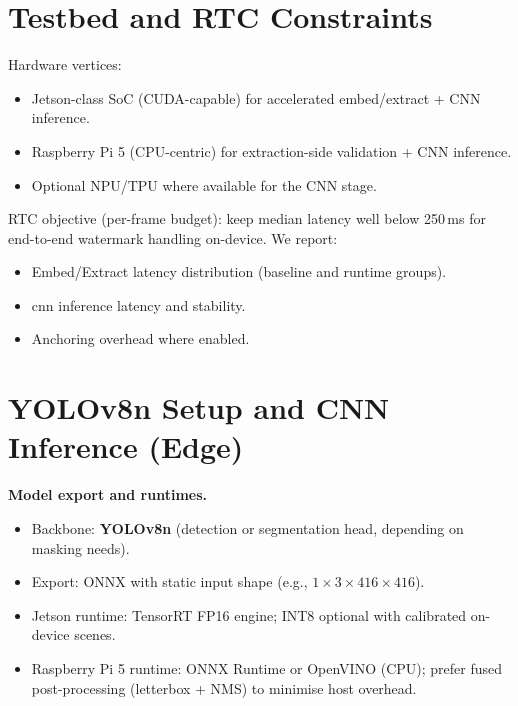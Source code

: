 
\section{Testbed and RTC Constraints}
\label{sec:validation:testbed}

Hardware vertices:
\begin{itemize}
    \item Jetson-class SoC (CUDA-capable) for accelerated embed/extract + CNN inference.
    \item Raspberry Pi 5 (CPU-centric) for extraction-side validation + CNN inference.
    \item Optional NPU/TPU where available for the CNN stage.
\end{itemize}

RTC objective (per-frame budget): keep median latency well below 250\,ms for end-to-end watermark handling on-device. We report:
\begin{itemize}
    \item Embed/Extract latency distribution (baseline and runtime groups).
    \item \gls{cnn} inference latency and stability.
    \item Anchoring overhead where enabled.
\end{itemize}

\section{YOLOv8n Setup and CNN Inference (Edge)}
\label{sec:validation:yolov8n-setup}

\textbf{Model export and runtimes.}
\begin{itemize}
  \item Backbone: \textbf{YOLOv8n} (detection or segmentation head, depending on masking needs).
  \item Export: ONNX with static input shape (e.g., \(1\times3\times416\times416\)).
  \item Jetson runtime: TensorRT FP16 engine; INT8 optional with calibrated on-device scenes.
  \item Raspberry Pi 5 runtime: ONNX Runtime or OpenVINO (CPU); prefer fused post-processing (letterbox + NMS) to minimise host overhead.
\end{itemize}

